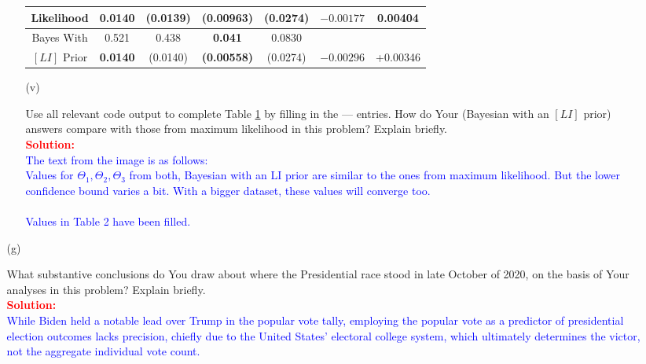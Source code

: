\documentclass[12pt]{article}
\begin{document}
\begin{itemize}
\begin{itemize}
\begin{itemize}
\begin{table}[t!]
\begin{tabular}{c||c|c|c|c|c|c}
Likelihood & \textbf{0.0140} & (0.0139) & (0.00963) & (0.0274) & $-0.00177$ & 0.00404 \\

\hline

Bayes With & 0.521 & 0.438 & \textbf{0.041} & 0.0830 & \multicolumn{1}{c|}{} \\

$[LI]$ Prior & \textbf{0.0140} & (0.0140) & \textbf{(0.00558)} & (0.0274) & $-0.00296$ & +0.00346

\end{tabular}

\label{t:summary-1}

\end{table}

\item[(v)]

Use all relevant code output to complete Table \ref{t:summary-1} by filling in the --- entries. How do Your (Bayesian with an $[LI]$ prior) answers compare with those from maximum likelihood in this problem? Explain briefly. \textit{\fbox{\textbf{[10 points]}}} \\
\textcolor{red}{\textbf{Solution:}} \\
\textcolor{blue}{The text from the image is as follows:
\\
Values for \( \Theta_1, \Theta_2, \Theta_3 \) from both, Bayesian with an LI prior are similar to the ones from maximum likelihood. But the lower confidence bound varies a bit. With a bigger dataset, these values will converge too.
\\ \\
Values in Table 2 have been filled. }

\end{itemize}

\item[(g)]

What substantive conclusions do You draw about where the Presidential race stood in late October of 2020, on the basis of Your analyses in this problem? Explain briefly. \textit{\fbox{\textbf{[10 points]}}} \\
\textcolor{red}{\textbf{Solution:}} \\
\textcolor{blue}{While Biden held a notable lead over Trump in the popular vote tally, employing the popular vote as a predictor of presidential election outcomes lacks precision, chiefly due to the United States' electoral college system, which ultimately determines the victor, not the aggregate individual vote count.}

\end{itemize}

\end{itemize}
\end{document}
